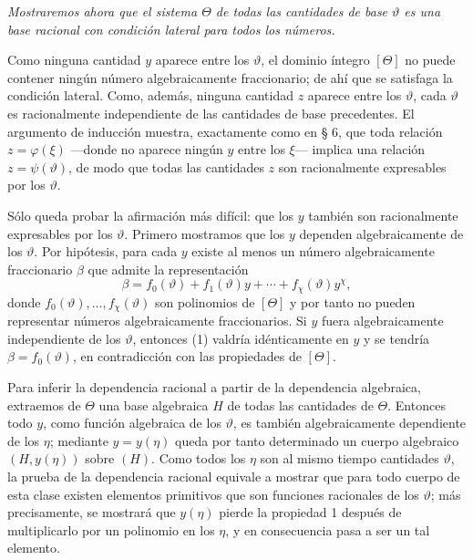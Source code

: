 \emph{Mostraremos ahora que el sistema $\Theta$ de todas las cantidades de base $\vartheta$ es una base racional con condición lateral para todos los números.}

Como ninguna cantidad $y$ aparece entre los $\vartheta$, el dominio íntegro $[\Theta]$ no puede contener ningún número algebraicamente fraccionario; de ahí que se satisfaga la condición lateral. Como, además, ninguna cantidad $z$ aparece entre los $\vartheta$, cada $\vartheta$ es racionalmente independiente de las cantidades de base precedentes. El argumento de inducción muestra, exactamente como en § 6, que toda relación $z=\varphi(\xi)$ ---donde no aparece ningún $y$ entre los $\xi$--- implica una relación $z=\psi(\vartheta)$, de modo que todas las cantidades $z$ son racionalmente expresables por los $\vartheta$.

Sólo queda probar la afirmación más difícil: que los $y$ también son racionalmente expresables por los $\vartheta$. Primero mostramos que los $y$ dependen algebraicamente de los $\vartheta$. Por hipótesis, para cada $y$ existe al menos un número algebraicamente fraccionario $\beta$ que admite la representación
\begin{equation}
\beta=f_0(\vartheta)+f_1(\vartheta)y+\cdots+f_\chi(\vartheta)y^\chi,
\tag{1}
\end{equation}
donde $f_0(\vartheta),\ldots,f_\chi(\vartheta)$ son polinomios de $[\Theta]$ y por tanto no pueden representar números algebraicamente fraccionarios. Si $y$ fuera algebraicamente independiente de los $\vartheta$, entonces (1) valdría idénticamente en $y$ y se tendría $\beta=f_0(\vartheta)$, en contradicción con las propiedades de $[\Theta]$.

Para inferir la dependencia racional a partir de la dependencia algebraica, extraemos de $\Theta$ una base algebraica $H$ de todas las cantidades de $\Theta$. Entonces todo $y$, como función algebraica de los $\vartheta$, es también algebraicamente dependiente de los $\eta$; mediante $y=y(\eta)$ queda por tanto determinado un cuerpo algebraico $(H,y(\eta))$ sobre $(H)$. Como todos los $\eta$ son al mismo tiempo cantidades $\vartheta$, la prueba de la dependencia racional equivale a mostrar que para todo cuerpo de esta clase existen elementos primitivos que son funciones racionales de los $\vartheta$; más precisamente, se mostrará que $y(\eta)$ pierde la propiedad 1 después de multiplicarlo por un polinomio en los $\eta$, y en consecuencia pasa a ser un tal elemento.

